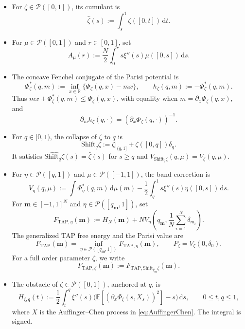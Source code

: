 \documentclass[a4paper,10pt,reqno]{amsart}
\numberwithin{equation}{section}
\newcommand{\dR}{\mathbb{R}}%
\newcommand{\dE}{\mathbb{E}}%
\newcommand{\mc}{\mathcal}
\newcommand{\dd}{\mathrm{d}}
\newcommand{\TAP}{\mathrm{TAP}}
\newcommand{\bfm}{\mathbf{m}}
\newcommand{\Shift}{\mathrm{Shift}}%
\begin{document}
	\begin{itemize}\itemsep2pt
		\item For \(\zeta\in\mc P([0,1])\), its cumulant is
		\begin{equation}\label{eq:order-parameter-cumulants}
			\widehat\zeta(s)
			:=
			\int_s^1\zeta([0,t])\,\dd t.
		\end{equation}
		
		\item For \(\mu\in\mc P([0,1])\) and \(r\in[0,1]\), set
		\begin{equation}\label{eq:ising-A-mu}
			A_\mu(r)
			:=
			\frac N2\int_0^r s\xi''(s)\mu([0,s])\,\dd s.
		\end{equation}
		
		\item The concave Fenchel conjugate of the Parisi potential is
		\[
		\Phi_\zeta^*(q,m)
		:=
		\inf_{x\in\dR}\{\Phi_\zeta(q,x)-mx\},
		\qquad
		h_\zeta(q,m):=-\Phi_\zeta^*(q,m).
		\]
		Thus \(mx+\Phi_\zeta^*(q,m)\le\Phi_\zeta(q,x)\), with equality when
		\(m=\partial_x\Phi_\zeta(q,x)\), and
		\[
		\partial_m h_\zeta(q,\cdot)
		=
		(\partial_x\Phi_\zeta(q,\cdot))^{-1}.
		\]
		
		\item For \(q\in[0,1)\), the collapse of \(\zeta\) to \(q\) is
		\[
		\Shift_q\zeta
		:=
		\zeta|_{(q,1]}+\zeta([0,q])\delta_q.
		\]
		It satisfies \(\widehat{\Shift_q\zeta}(s)=\widehat\zeta(s)\) for
		\(s\ge q\) and \(V_{\Shift_q\zeta}(q,\mu)=V_\zeta(q,\mu)\).
		
		\item For \(\eta\in\mc P([q,1])\) and
		\(\mu\in\mc P([-1,1])\), the band correction is
		\[
		V_\eta(q,\mu)
		:=
		\int\Phi_\eta^*(q,m)\,\dd\mu(m)
		-
		\frac12\int_q^1s\xi''(s)\eta([0,s])\,\dd s.
		\]
		For \(\bfm\in[-1,1]^N\) and
		\(\eta\in\mc P([q_\bfm,1])\), set
		\[
		F_{\TAP,\eta}(\bfm)
		:=
		H_N(\bfm)
		+
		N V_\eta\left(
		q_\bfm,\frac1N\sum_{i=1}^N\delta_{m_i}
		\right).
		\]
		The generalized TAP free energy and the Parisi value are
		\[
		F_{\TAP}(\bfm)
		=
		\inf_{\eta\in\mc P([q_\bfm,1])}F_{\TAP,\eta}(\bfm),
		\qquad
		P_\zeta=V_\zeta(0,\delta_0).
		\]
		For a full order parameter \(\zeta\), we write
		\[
		F_{\TAP,\zeta}(\bfm)
		:=
		F_{\TAP,\Shift_{q_\bfm}\zeta}(\bfm).
		\]
		
		\item The obstacle of \(\zeta\in\mc P([0,1])\), anchored at \(q\), is
		\begin{equation}\label{eq:ward-obstacle}
			H_{\zeta,q}(t)
			:=
			\frac12\int_t^q\xi''(s)
			\bigl(\dE[(\partial_x\Phi_\zeta(s,X_s))^2]-s\bigr)\,\dd s,
			\qquad 0\le t,q\le1,
		\end{equation}
		where \(X\) is the Auffinger--Chen process in
		\eqref{eq:AuffingerChen}. The integral is signed.
	\end{itemize}
	
\end{document}
